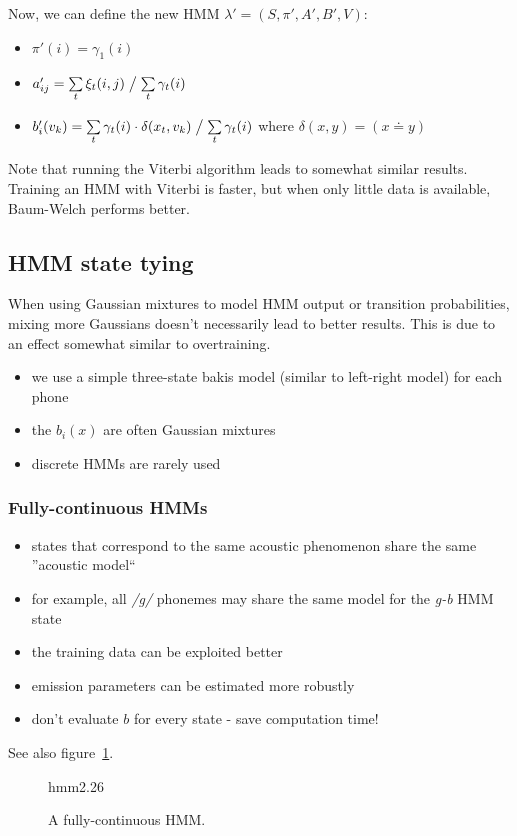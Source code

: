 Now, we can define the new HMM $\lambda' = (S, \pi', A', B', V)$:
\begin{itemize}
    \item $\pi'(i) = \gamma_1(i)$
    \item $a'_{ij} = \sum\limits_t \xi_t(i, j) \bigm/ \sum\limits_t \gamma_t(i)$
    \item $b'_i(v_k) = \sum\limits_t \gamma_t(i) \cdot \delta(x_t, v_k) \bigm/ \sum\limits_t \gamma_t(i)$ where $\delta(x, y) = (x \doteq y)$
\end{itemize}

Note that running the Viterbi algorithm leads to somewhat similar results. Training an HMM with Viterbi is faster, but when only little data is available, Baum-Welch performs better.

\subsection{HMM state tying}

When using Gaussian mixtures to model HMM output or transition probabilities, mixing more Gaussians doesn't necessarily lead to better results. This is due to an effect somewhat similar to overtraining.

\begin{itemize}
    \item we use a simple three-state bakis model (similar to left-right model) for each phone
    \item the $b_i(x)$ are often Gaussian mixtures
    \item discrete HMMs are rarely used
\end{itemize}

\subsubsection{Fully-continuous HMMs}
\begin{itemize}
    \item states that correspond to the same acoustic phenomenon share the same ''acoustic model``
    \item for example, all \textit{/g/} phonemes may share the same model for the \textit{g-b} HMM state
    \item the training data can be exploited better
    \item emission parameters can be estimated more robustly
    \item don't evaluate $b$ for every state - save computation time!
\end{itemize}
See also figure~\ref{fig:fullyContinuousHMMs}.
\begin{figure}[htb]
    \begin{minipage}{\linewidth}
        \vspace{6cm}
        \hfill \scriptsize hmm2.26
    \end{minipage}
    \caption{\label{fig:fullyContinuousHMMs} A fully-continuous HMM.}
\end{figure}

